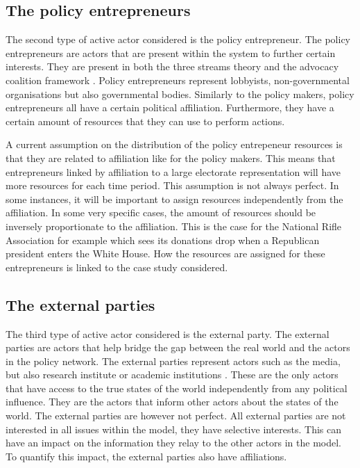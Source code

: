 \subsection{The policy entrepreneurs}

The second type of active actor considered is the policy entrepreneur. The policy entrepreneurs are actors that are present within the system to further certain interests. They are present in both the three streams theory and the advocacy coalition framework \citep{zahariadis2014ambiguity, jenkins2014advocacy}. Policy entrepreneurs represent lobbyists, non-governmental organisations but also governmental bodies. Similarly to the policy makers, policy entrepreneurs all have a certain political affiliation. Furthermore, they have a certain amount of resources that they can use to perform actions.

A current assumption on the distribution of the policy entrepeneur resources is that they are related to affiliation like for the policy makers. This means that entrepreneurs linked by affiliation to a large electorate representation will have more resources for each time period. This assumption is not always perfect. In some instances, it will be important to assign resources independently from the affiliation. In some very specific cases, the amount of resources should be inversely proportionate to the affiliation. This is the case for the National Rifle Association for example which sees its donations drop when a Republican president enters the White House. How the resources are assigned for these entrepreneurs is linked to the case study considered.

\subsection{The external parties}

The third type of active actor considered is the external party. The external parties are actors that help bridge the gap between the real world and the actors in the policy network. The external parties represent actors such as the media, but also research institute or academic institutions  \citep{birkland2004world, van2000new, mccombs1972agenda, cook1983media, kosicki1993problems, van1993domestic}. These are the only actors that have access to the true states of the world independently from any political influence. They are the actors that inform other actors about the states of the world. The external parties are however not perfect. All external parties are not interested in all issues within the model, they have selective interests. This can have an impact on the information they relay to the other actors in the model. To quantify this impact, the external parties also have affiliations.

